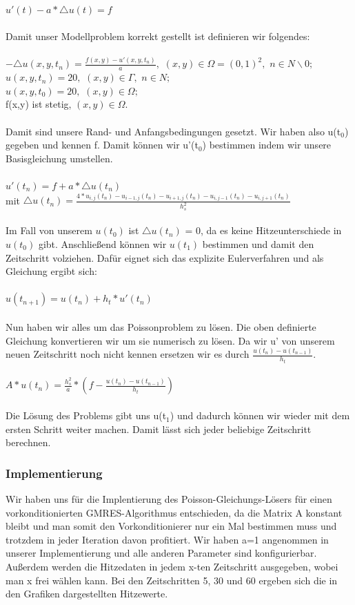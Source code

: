 \documentclass{report}
\begin{document}
\\
$u'(t) - a * \triangle u(t) = f$\\
\\
Damit unser Modellproblem korrekt gestellt ist definieren wir folgendes:\\
\\
$- \triangle u(x,y,t_{n}) = \frac{f(x,y)-u'(x,y,t_{n})}{a}   ,$   $  (x,y) \in \Omega = (0,1)^2  ,$   $  n \in N\backslash0;$\\
$u(x,y,t_{n}) = 20,$   $(x,y) \in \Gamma ,$   $ n \in N;$\\
$u(x,y,t_{0}) = 20,$   $ (x,y) \in \Omega ; $ \\
f(x,y) ist stetig,   $ (x,y) \in \Omega .$ \\
\\
Damit sind unsere Rand- und Anfangsbedingungen gesetzt. Wir haben also u(t$_{0}$) gegeben und kennen f. Damit können wir u'(t$_{0}$) bestimmen indem wir unsere Basisgleichung umstellen.\\
\\
$u'(t_{n})  = f + a * \triangle u(t_{n})$\\
mit $\triangle u(t_{n}) = \frac{4*u_{i,j}(t_{n})-u_{i-1,j}(t_{n})-u_{i+1,j}(t_{n})-u_{i,j-1}(t_{n})-u_{i,j+1}(t_{n})}{h_{s}^{2}}$\\
\\
Im Fall von unserem $u(t_{0})$ ist $\triangle u(t_{n})$ = 0, da es keine Hitzeunterschiede in $u(t_{0})$ gibt. Anschließend können wir $u(t_{1})$ bestimmen und damit den Zeitschritt volziehen. Dafür eignet sich das explizite Eulerverfahren und als Gleichung ergibt sich:\\
\\
$u(t_{n+1})  =u(t_{n}) + h_{t} * u'(t_{n})$\\
\\
Nun haben wir alles um das Poissonproblem zu lösen. Die oben definierte Gleichung konvertieren wir um sie numerisch zu lösen. Da wir u' von unserem neuen Zeitschritt noch nicht kennen ersetzen wir es durch $\frac{ u(t_{n}) -  u(t_{n-1})}{h_{t}}$.\\
\\
$A* u(t_{n}) = \frac{h_{s}^{2}}{a} * ( f-\frac{ u(t_{n}) -  u(t_{n-1})}{h_{t}}) $\\
\\
Die Lösung des Problems gibt uns u(t$_{1}$) und dadurch können wir wieder mit dem ersten Schritt weiter machen. Damit lässt sich jeder beliebige Zeitschritt berechnen.
\subsubsection{Implementierung}
Wir haben uns für die Implentierung des Poisson-Gleichungs-Lösers für einen vorkonditionierten GMRES-Algorithmus entschieden, da die Matrix A konstant bleibt und man somit den Vorkonditionierer nur ein Mal bestimmen muss und trotzdem in jeder Iteration davon profitiert. Wir haben a=1 angenommen in unserer Implementierung und alle anderen Parameter sind konfigurierbar. Außerdem werden die Hitzedaten in jedem x-ten Zeitschritt ausgegeben, wobei man x frei wählen kann. Bei den Zeitschritten 5, 30 und 60 ergeben sich die in den Grafiken dargestellten Hitzewerte. \\
\end{document}
